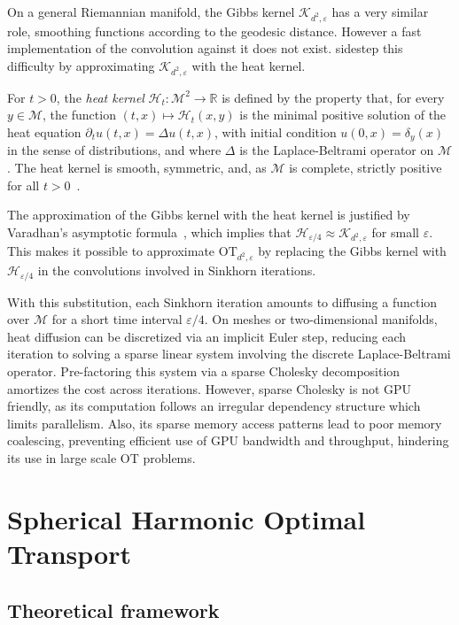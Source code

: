 \documentclass{article}
\theoremstyle{plain}
\theoremstyle{definition}
\theoremstyle{remark}
\newcommand{\M}{\ensuremath{\mathcal{M}}}
\begin{document}
On a general Riemannian manifold, the Gibbs kernel $\mathcal{K}_{d^2,\varepsilon}$ has a very similar role, smoothing functions according to the geodesic distance. However a fast implementation of the convolution against it does not exist. \cite{solomon2015convolutional} sidestep this difficulty by approximating
$\mathcal{K}_{d^2,\varepsilon}$ with the heat kernel. 

For $t > 0$, the \emph{heat kernel} $\mathcal{H}_t: \M^2 \to \mathbb{R}$ is defined by the property that, for every $y \in \mathcal{M}$, the function $(t,x) \mapsto \mathcal{H}_t(x,y)$ is the minimal positive solution of the heat equation $\partial_t u(t,x) = \Delta u(t,x)$, with initial condition $u(0,x) = \delta_y(x)$ in the sense of distributions, and where $\Delta$ is the Laplace-Beltrami operator on $\M$.
The heat kernel is smooth, symmetric, and, as $\M$ is complete, strictly positive
for all $t>0$~\cite[Thm.~7.20, Cor.~8.12]{grigoryan2009heat}.

The approximation of the Gibbs kernel with the heat kernel is justified by Varadhan's asymptotic formula~\cite{varadhan1967}, which implies that $\mathcal{H}_{\varepsilon/4} \approx \mathcal{K}_{d^2,\varepsilon} $ for small $\varepsilon$.
This makes it possible to approximate $\mathrm{OT}_{d^2,\varepsilon}$ by
replacing the Gibbs kernel with $\mathcal{H}_{\varepsilon/4}$ in the convolutions involved in Sinkhorn iterations.


With this substitution, each Sinkhorn iteration amounts to diffusing a function
over $\mathcal{M}$ for a short time interval $\varepsilon/4$.
On meshes or two-dimensional manifolds, heat diffusion can be discretized via an
implicit Euler step, reducing each iteration to solving a sparse linear system
involving the discrete Laplace-Beltrami operator.
Pre-factoring this system via a sparse Cholesky decomposition amortizes the cost
across iterations. However, sparse Cholesky is not GPU friendly, as its computation follows an irregular dependency structure which limits parallelism. Also, its sparse memory access patterns lead to poor memory coalescing, preventing efficient use of GPU bandwidth and throughput, hindering its use in large scale OT problems.


\section{Spherical Harmonic Optimal Transport}
\subsection{Theoretical framework}
\end{document}
